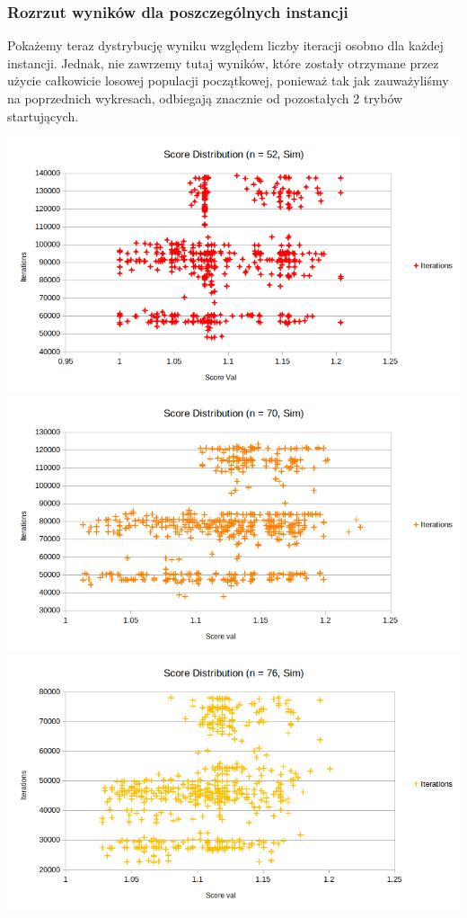 \documentclass{article}
\begin{document}
\subsubsection{Rozrzut wyników dla poszczególnych instancji}
Pokażemy teraz dystrybucję wyniku względem liczby iteracji osobno dla każdej instancji. Jednak, nie zawrzemy tutaj wyników, które zostały otrzymane przez użycie całkowicie losowej populacji początkowej, ponieważ tak jak zauważyliśmy na poprzednich wykresach, odbiegają znacznie od pozostałych 2 trybów startujących.

\includegraphics[scale=0.36]{simDist52}
\includegraphics[scale=0.36]{simDist70}
\includegraphics[scale=0.36]{simDist76}
\end{document}
